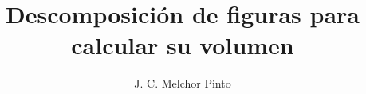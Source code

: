\documentclass[12pt]{guia}
\title{Descomposición de figuras para calcular su volumen}
\author{J. C. Melchor Pinto}
\begin{document}
\pagestyle{headandfoot}
\addpoints
\INFO
\printanswers
\begin{multicols}{2}
    
    
    
\end{multicols}
\begin{questions}
    \questionboxed[10]{}
    \questionboxed[10]{}
    \questionboxed[10]{}
    \questionboxed[10]{}
    \questionboxed[10]{}
    \questionboxed[10]{}
    \questionboxed[10]{}
    \questionboxed[10]{}
    \questionboxed[10]{}
    \questionboxed[10]{}
\end{questions}
\end{document}
